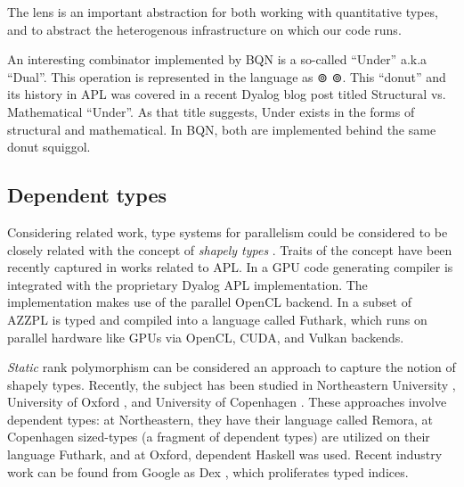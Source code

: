 \documentclass[10pt,a4paper]{article}
\begin{document}
The lens is an important abstraction for both working with quantitative types, and to abstract the heterogenous infrastructure on which our code runs.

An interesting combinator implemented by BQN is a so-called “Under” a.k.a “Dual”. This operation is represented in the language as
⊚
⊚. This “donut” and its history in APL was covered in a recent Dyalog blog post titled Structural vs. Mathematical “Under”. As that title suggests, Under exists in the forms of structural and mathematical. In BQN, both are implemented behind the same donut squiggol.




\subsection{Dependent types}

Considering related work, type systems for parallelism could be considered to be closely related with the concept of \emph{shapely types} \cite{jay1994shapely, shkaravska2007polynomial}. Traits of the concept have been recently captured in works related to APL. In \cite{hsu2019phd} a GPU code generating compiler is integrated with the proprietary Dyalog APL implementation. The implementation makes use of the parallel OpenCL backend. In \cite{Henriksen:2016:AGT:2975991.2975997} a subset of AZZPL is typed and compiled into a language called Futhark, which runs on parallel hardware like GPUs via OpenCL, CUDA, and Vulkan backends.

\emph{Static} rank polymorphism can be considered an approach to capture the notion of shapely types. Recently, the subject has been studied in Northeastern University \cite{slepak2014array, slepak2019semantics, shivers2019introduction}, University of Oxford \cite{gibbons2017aplicative}, and University of Copenhagen \cite{henriksen:phdthesis}. These approaches involve dependent types: at Northeastern, they have their language called Remora, at Copenhagen sized-types (a fragment of dependent types) are utilized on their language Futhark, and at Oxford, dependent Haskell was used. Recent industry work can be found from Google as Dex \cite{paszke2021getting}, which proliferates typed indices.
\end{document}
